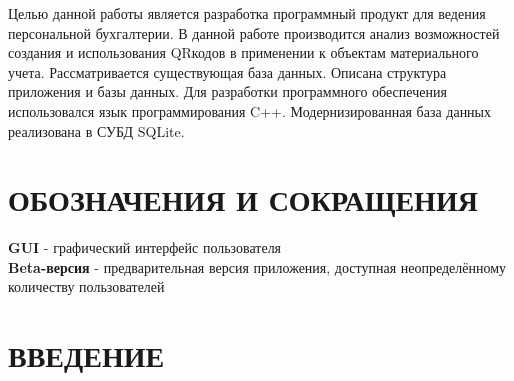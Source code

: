 \documentclass[a4paper,12pt]{article}
\begin{document}
Целью данной работы является разработка программный продукт для ведения персональной бухгалтерии. В данной работе производится анализ возможностей создания и использования QRкодов в применении к объектам материального учета. Рассматривается существующая база данных. Описана структура приложения и базы данных. Для разработки программного обеспечения использовался язык программирования C++. Модернизированная база данных реализована в СУБД SQLite.  

\pagebreak
\thispagestyle{empty}


\part*{\centering ОБОЗНАЧЕНИЯ И СОКРАЩЕНИЯ}
\textbf{GUI} - графический интерфейс пользователя\\
\textbf{Beta-версия} - предварительная версия приложения, доступная неопределённому количеству пользователей\\
\pagebreak



\tableofcontents

\pagebreak

\part*{\centering ВВЕДЕНИЕ}
\pagebreak

%
\pagebreak
\pagebreak
\pagebreak
\pagebreak

\pagebreak
\end{document}
